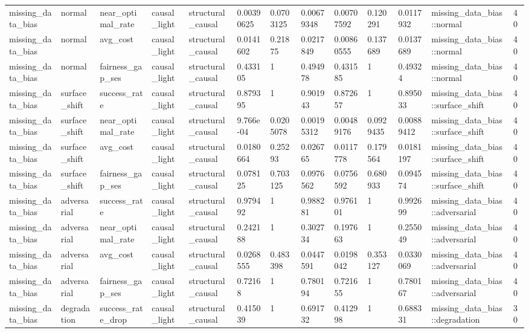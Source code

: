 \begin{tabular}{lllllllllllll}
missing\_data\_bias & normal & near\_optimal\_rate & causal\_light & structural\_causal & 0.00390625 & 0.0703125 & 0.00679348 & 0.00707592 & 0.120291 & 0.0117932 & missing\_data\_bias::normal & 40 \\
missing\_data\_bias & normal & avg\_cost & causal\_light & structural\_causal & 0.0141602 & 0.21875 & 0.0217849 & 0.00860555 & 0.137689 & 0.0137689 & missing\_data\_bias::normal & 40 \\
missing\_data\_bias & normal & fairness\_gap\_ses & causal\_light & structural\_causal & 0.433105 & 1 & 0.494978 & 0.431585 & 1 & 0.49324 & missing\_data\_bias::normal & 40 \\
missing\_data\_bias & surface\_shift & success\_rate & causal\_light & structural\_causal & 0.879395 & 1 & 0.901943 & 0.872657 & 1 & 0.895033 & missing\_data\_bias::surface\_shift & 40 \\
missing\_data\_bias & surface\_shift & near\_optimal\_rate & causal\_light & structural\_causal & 9.766e-04 & 0.0205078 & 0.00195312 & 0.00489176 & 0.0929435 & 0.00889412 & missing\_data\_bias::surface\_shift & 40 \\
missing\_data\_bias & surface\_shift & avg\_cost & causal\_light & structural\_causal & 0.0180664 & 0.25293 & 0.026765 & 0.0117778 & 0.179564 & 0.0181197 & missing\_data\_bias::surface\_shift & 40 \\
missing\_data\_bias & surface\_shift & fairness\_gap\_ses & causal\_light & structural\_causal & 0.078125 & 0.703125 & 0.0976562 & 0.0756592 & 0.680933 & 0.094574 & missing\_data\_bias::surface\_shift & 40 \\
missing\_data\_bias & adversarial & success\_rate & causal\_light & structural\_causal & 0.979492 & 1 & 0.988281 & 0.976101 & 1 & 0.992699 & missing\_data\_bias::adversarial & 40 \\
missing\_data\_bias & adversarial & near\_optimal\_rate & causal\_light & structural\_causal & 0.242188 & 1 & 0.302734 & 0.197663 & 1 & 0.255049 & missing\_data\_bias::adversarial & 40 \\
missing\_data\_bias & adversarial & avg\_cost & causal\_light & structural\_causal & 0.0268555 & 0.483398 & 0.0447591 & 0.0198042 & 0.353127 & 0.0330069 & missing\_data\_bias::adversarial & 40 \\
missing\_data\_bias & adversarial & fairness\_gap\_ses & causal\_light & structural\_causal & 0.72168 & 1 & 0.780194 & 0.721655 & 1 & 0.780167 & missing\_data\_bias::adversarial & 40 \\
missing\_data\_bias & degradation & success\_rate\_drop & causal\_light & structural\_causal & 0.415039 & 1 & 0.691732 & 0.412998 & 1 & 0.688331 & missing\_data\_bias::degradation & 30 \\

\end{tabular}
